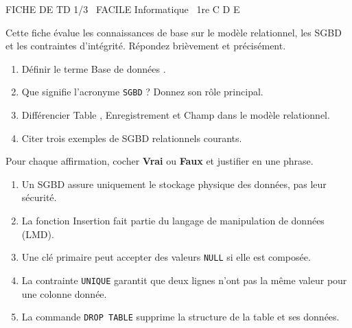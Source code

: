 \documentclass[11pt]{article}
\begin{document}
\begin{tcolorbox}[enhanced,colback=popink,colframe=popink,arc=10pt,boxrule=0pt,left=12pt,right=12pt,top=9pt,bottom=9pt]
{\color{white}\popxbold\small FICHE DE TD 1/3 \textbullet\ FACILE \hfill Informatique \textbullet\ 1re C D E\par}
\end{tcolorbox}
\vspace{4pt}
\noindent Cette fiche évalue les connaissances de base sur le modèle relationnel, les SGBD et les contraintes d'intégrité. Répondez brièvement et précisément.

\begin{exercice}
\begin{enumerate}
    \item Définir le terme \og Base de données \fg.
    \item Que signifie l'acronyme \texttt{SGBD} ? Donnez son rôle principal.
    \item Différencier \og Table \fg, \og Enregistrement \fg et \og Champ \fg dans le modèle relationnel.
    \item Citer trois exemples de SGBD relationnels courants.
\end{enumerate}
\end{exercice}

\begin{exercice}
Pour chaque affirmation, cocher \textbf{Vrai} ou \textbf{Faux} et justifier en une phrase.
\begin{enumerate}
    \item Un SGBD assure uniquement le stockage physique des données, pas leur sécurité.
    \item La fonction \og Insertion \fg fait partie du langage de manipulation de données (LMD).
    \item Une clé primaire peut accepter des valeurs \texttt{NULL} si elle est composée.
    \item La contrainte \texttt{UNIQUE} garantit que deux lignes n'ont pas la même valeur pour une colonne donnée.
    \item La commande \texttt{DROP TABLE} supprime la structure de la table et ses données.
\end{enumerate}
\end{exercice}
\end{document}
